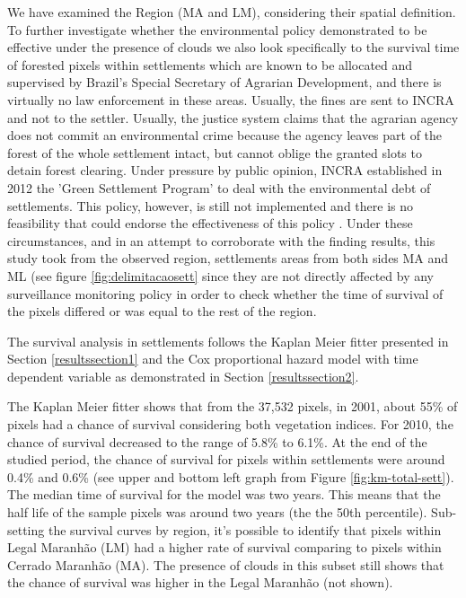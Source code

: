 We have examined the Region (MA and LM), considering their spatial definition. To further investigate whether the environmental policy demonstrated to be effective under the presence of clouds we also look specifically to the survival time of forested pixels within settlements which are known to be allocated and supervised by Brazil’s Special Secretary of Agrarian Development, and there is virtually no law enforcement in these areas. Usually, the fines are sent to INCRA and not to the settler. Usually, the justice system claims that the agrarian agency does not commit an environmental crime because the agency leaves part of the forest of the whole settlement intact, but cannot oblige the granted slots to detain forest clearing. Under pressure by public opinion, INCRA established in 2012 the 'Green Settlement Program' to deal with the environmental debt of settlements. This policy, however, is still not implemented and there is no feasibility that could endorse the effectiveness of this policy \citet{PACHECO,PERES2}. Under these circumstances, and in an attempt to corroborate with the finding results, this study took from the observed region, settlements areas from both sides MA and ML (see figure \ref{fig:delimitacaosett} since they are not directly affected by any surveillance monitoring policy in order to check whether the time of survival of the pixels differed or was equal to the rest of the region.

The survival analysis in settlements follows the  Kaplan Meier fitter presented in  Section \ref{resultssection1} and the Cox proportional hazard model with time dependent variable as demonstrated in Section \ref{resultssection2}. 

The Kaplan Meier fitter shows that from the 37,532 pixels, in 2001, about 55\% of pixels had a chance of survival considering both vegetation indices. For 2010, the chance of survival decreased to the range of 5.8\% to 6.1\%. At the end of the studied period, the chance of survival for pixels within settlements were around 0.4\% and 0.6\% (see upper and bottom left graph from Figure \ref{fig:km-total-sett}). The median time of survival for the model was two years. This means that the half life of the sample pixels was around two years (the the 50th percentile). Sub-setting the survival curves by region, it's possible to identify that pixels within Legal Maranhão (LM) had a higher rate of survival comparing to pixels within Cerrado Maranhão (MA). The presence of clouds in this subset still shows that the chance of survival was higher in the Legal Maranhão (not shown). 

